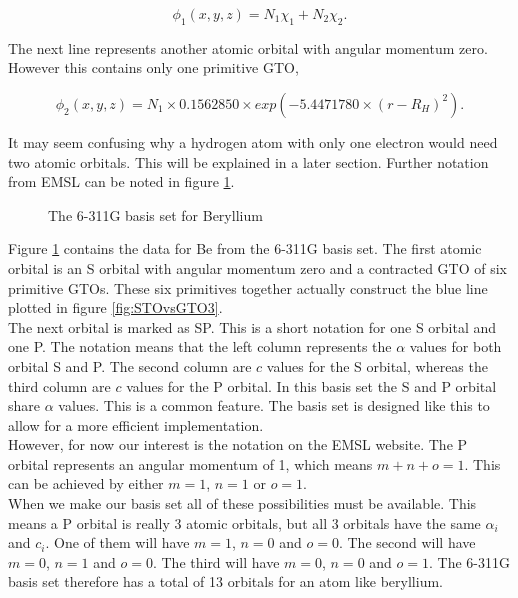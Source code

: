 \documentclass[a4paper,norsk,11pt,twoside]{report}
\begin{document}
\begin{equation}
\phi_1(x,y,z) = N_1 \chi_1 + N_2 \chi_2 .
\end{equation}

The next line represents another atomic orbital with angular momentum zero. However this contains only one primitive GTO, 

\begin{equation}
\phi_2(x,y,z) = N_1 \times 0.1562850 \times exp(-5.4471780 \times (r-R_H)^2) .
\end{equation}

It may seem confusing why a hydrogen atom with only one electron would
need two atomic orbitals. This will be explained in a later
section. Further notation from EMSL can be noted in figure
\ref{fig:6-31G_Be}. 

\begin{figure}[h!]
\begin{center}
\caption{The 6-311G basis set for Beryllium}
\label{fig:6-31G_Be}
\end{center}
\end{figure}

Figure \ref{fig:6-31G_Be} contains the data  for Be from the 6-311G basis set. The first atomic
orbital is an S orbital with angular momentum zero and a contracted
GTO of six primitive GTOs. These six primitives together actually
construct the blue line plotted in figure \ref{fig:STOvsGTO3}. \\

The next orbital is marked as SP. This is a short notation for one S
orbital and one P. The notation means that the left column represents
the $\alpha$ values for both orbital S and P. The second column are
$c$ values for the S orbital, whereas the third column are $c$ values
for the P orbital. In this basis set the S and P orbital share
$\alpha$ values. This is a common feature. The basis set is designed
like this to allow for a more efficient
implementation. \\

However, for now our interest is the notation on the EMSL website. The P
orbital represents an angular momentum of 1, which means $m + n + o =
1$. This can be achieved by either $m=1$, $n=1$ or $o=1$. \\

When we make our basis set all of these possibilities must be available. This means a P orbital is really 3 atomic orbitals, but all 3 orbitals have the same $\alpha_i$ and $c_i$. One of them will have $m=1$, $n=0$ and $o=0$. The second will have $m=0$, $n=1$ and $o=0$. The third will have $m=0$, $n=0$ and $o=1$. The 6-311G basis set therefore has a total of 13 orbitals for an atom like beryllium.\\
\end{document}
